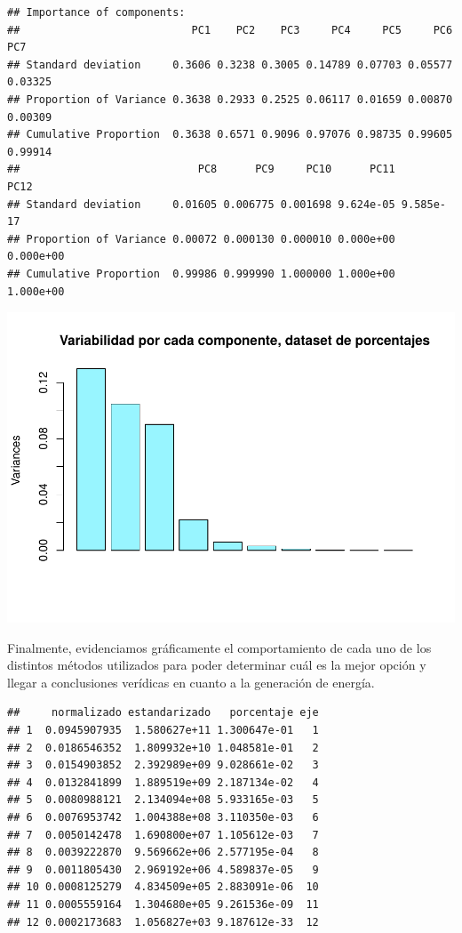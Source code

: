 \documentclass[
]{article}
\begin{document}
\begin{verbatim}
## Importance of components:
##                           PC1    PC2    PC3     PC4     PC5     PC6     PC7
## Standard deviation     0.3606 0.3238 0.3005 0.14789 0.07703 0.05577 0.03325
## Proportion of Variance 0.3638 0.2933 0.2525 0.06117 0.01659 0.00870 0.00309
## Cumulative Proportion  0.3638 0.6571 0.9096 0.97076 0.98735 0.99605 0.99914
##                            PC8      PC9     PC10      PC11      PC12
## Standard deviation     0.01605 0.006775 0.001698 9.624e-05 9.585e-17
## Proportion of Variance 0.00072 0.000130 0.000010 0.000e+00 0.000e+00
## Cumulative Proportion  0.99986 0.999990 1.000000 1.000e+00 1.000e+00
\end{verbatim}

\includegraphics{AMTV_Docum_Consolidado_files/figure-latex/unnamed-chunk-16-1.pdf}

Finalmente, evidenciamos gráficamente el comportamiento de cada uno de
los distintos métodos utilizados para poder determinar cuál es la mejor
opción y llegar a conclusiones verídicas en cuanto a la generación de
energía.

\begin{verbatim}
##     normalizado estandarizado   porcentaje eje
## 1  0.0945907935  1.580627e+11 1.300647e-01   1
## 2  0.0186546352  1.809932e+10 1.048581e-01   2
## 3  0.0154903852  2.392989e+09 9.028661e-02   3
## 4  0.0132841899  1.889519e+09 2.187134e-02   4
## 5  0.0080988121  2.134094e+08 5.933165e-03   5
## 6  0.0076953742  1.004388e+08 3.110350e-03   6
## 7  0.0050142478  1.690800e+07 1.105612e-03   7
## 8  0.0039222870  9.569662e+06 2.577195e-04   8
## 9  0.0011805430  2.969192e+06 4.589837e-05   9
## 10 0.0008125279  4.834509e+05 2.883091e-06  10
## 11 0.0005559164  1.304680e+05 9.261536e-09  11
## 12 0.0002173683  1.056827e+03 9.187612e-33  12
\end{verbatim}
\end{document}
